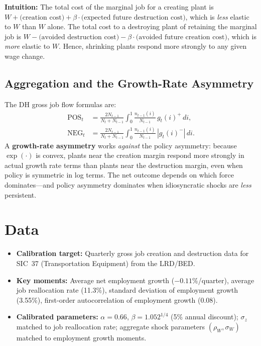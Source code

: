 \textbf{Intuition:} The total cost of the marginal job for a creating plant is
$W + \text{(creation cost)} + \beta \cdot \text{(expected future destruction cost)}$,
which is \emph{less} elastic to $W$ than $W$ alone. The total cost to a
destroying plant of retaining the marginal job is $W - \text{(avoided
destruction cost)} - \beta\cdot\text{(avoided future creation cost)}$, which
is \emph{more} elastic to $W$. Hence, shrinking plants respond more strongly to
any given wage change.

\subsection*{Aggregation and the Growth-Rate Asymmetry}

The DH gross job flow formulas are:
\begin{align}
  \text{POS}_t &= \frac{2N_{t-1}}{N_t + N_{t-1}}
    \int_0^1 \frac{n_{t-1}(i)}{N_{t-1}}\, g_t(i)^+ \,di, \\[4pt]
  \text{NEG}_t &= \frac{2N_{t-1}}{N_t + N_{t-1}}
    \int_0^1 \frac{n_{t-1}(i)}{N_{t-1}}\, |g_t(i)^-| \,di.
\end{align}
A \textbf{growth-rate asymmetry} works \emph{against} the policy asymmetry:
because $\exp(\cdot)$ is convex, plants near the creation margin respond more
strongly in actual growth rate terms than plants near the destruction margin,
even when policy is symmetric in log terms. The net outcome depends on which
force dominates---and policy asymmetry dominates when idiosyncratic shocks are
\emph{less} persistent.

\section{Data}

\begin{itemize}
  \item \textbf{Calibration target:} Quarterly gross job creation and
    destruction data for SIC~37 (Transportation Equipment) from the LRD/BED.
  \item \textbf{Key moments:} Average net employment growth ($-0.11\%$/quarter),
    average job reallocation rate (11.3\%), standard deviation of employment
    growth (3.55\%), first-order autocorrelation of employment growth (0.08).
  \item \textbf{Calibrated parameters:} $\alpha=0.66$, $\beta=1.052^{1/4}$
    (5\% annual discount); $\sigma_z$ matched to job reallocation rate;
    aggregate shock parameters $(\rho_W, \sigma_W)$ matched to employment
    growth moments.
\end{itemize}

